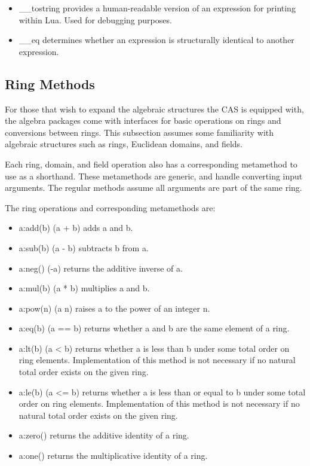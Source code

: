 \documentclass{article}
\begin{document}
\begin{itemize}
    \item {\ttfamily \_\_tostring} provides a human-readable version of an expression for printing within Lua. Used for debugging purposes.
    
    \item {\ttfamily \_\_eq} determines whether an expression is structurally identical to another expression.
\end{itemize}

\subsection{Ring Methods}

For those that wish to expand the algebraic structures the CAS is equipped with, the algebra packages come with interfaces for basic operations on rings and conversions between rings. This subsection assumes some familiarity with algebraic structures such as rings, Euclidean domains, and fields.

Each ring, domain, and field operation also has a corresponding metamethod to use as a shorthand. These metamethods are generic, and handle converting input arguments. The regular methods assume all arguments are part of the same ring.

The ring operations and corresponding metamethods are:

\begin{itemize}
    \item {\ttfamily a:add(b)} ({\ttfamily a + b}) adds {\ttfamily a} and {\ttfamily b}.
    \item {\ttfamily a:sub(b)} ({\ttfamily a - b}) subtracts {\ttfamily b} from {\ttfamily a}.
    \item {\ttfamily a:neg()} ({\ttfamily -a}) returns the additive inverse of {\ttfamily a}.
    \item {\ttfamily a:mul(b)} ({\ttfamily a * b}) multiplies {\ttfamily a} and {\ttfamily b}.
    \item {\ttfamily a:pow(n)} ({\ttfamily a \wedge{} n}) raises {\ttfamily a} to the power of an integer {\ttfamily n}.
    \item {\ttfamily a:eq(b)} ({\ttfamily a == b}) returns whether {\ttfamily a} and b are the same element of a ring.
    \item {\ttfamily a:lt(b)} ({\ttfamily a < b}) returns whether {\ttfamily a} is less than {\ttfamily b} under some total order on ring elements. Implementation of this method is not necessary if no natural total order exists on the given ring. 
    \item {\ttfamily a:le(b)} ({\ttfamily a <= b}) returns whether {\ttfamily a} is less than or equal to {\ttfamily b} under some total order on ring elements. Implementation of this method is not necessary if no natural total order exists on the given ring.
    \item {\ttfamily a:zero()} returns the additive  identity of a ring.
    \item {\ttfamily a:one()} returns the multiplicative identity of a ring.
\end{itemize}
\end{document}
